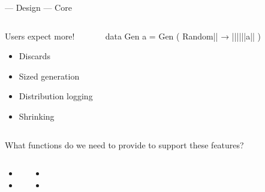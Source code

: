\begin{frame}[t,fragile]{\halcheck{} --- Design --- Core}
  \begin{columns}[onlytextwidth]
    \begin{block}{Users expect more!}
      \begin{itemize}
        \item<2-|alert@2,7> Discards
        \item<3-|alert@3,8> Sized generation
        \item<4-|alert@4,9> Distribution logging
        \item<5-|alert@5,10> Shrinking
      \end{itemize}
    \end{block}

    \begin{haskellcode}
      data Gen a = Gen
        ( Random||
        → ||||||a||
        )
    \end{haskellcode}
  \end{columns}

  What \alert{functions} do we need to provide to support these features?

  \begin{columns}[onlytextwidth]
    \begin{itemize}
      \item<7->[\alert<7>{\textbullet}]  
      \item<9->[\alert<9>{\textbullet}] 
    \end{itemize}
    \begin{itemize}
      \item<8->[\alert<8>{\textbullet}] 
      \item<10->[\alert<10>{\textbullet}] 
    \end{itemize}
  \end{columns}
\end{frame}

